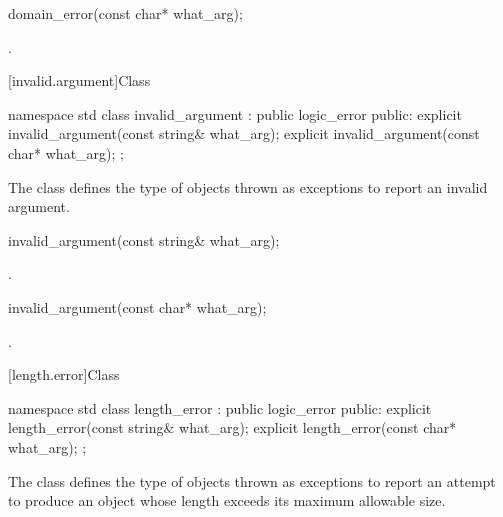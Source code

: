 %
\begin{itemdecl}
domain_error(const char* what_arg);
\end{itemdecl}

\begin{itemdescr}
\pnum
\ensures
{}.
\end{itemdescr}

[invalid.argument]{Class }

%
\begin{codeblock}
namespace std {
  class invalid_argument : public logic_error {
  public:
    explicit invalid_argument(const string& what_arg);
    explicit invalid_argument(const char* what_arg);
  };
}
\end{codeblock}

\pnum
The class
defines the type of objects thrown as exceptions to report an invalid argument.

%
\begin{itemdecl}
invalid_argument(const string& what_arg);
\end{itemdecl}

\begin{itemdescr}
\pnum
\ensures
{}.
\end{itemdescr}

%
\begin{itemdecl}
invalid_argument(const char* what_arg);
\end{itemdecl}

\begin{itemdescr}
\pnum
\ensures
{}.
\end{itemdescr}

[length.error]{Class }

%
\begin{codeblock}
namespace std {
  class length_error : public logic_error {
  public:
    explicit length_error(const string& what_arg);
    explicit length_error(const char* what_arg);
  };
}
\end{codeblock}

\pnum
The class
defines the type of objects thrown as exceptions
to report an attempt to produce
an object whose length exceeds its maximum allowable size.

